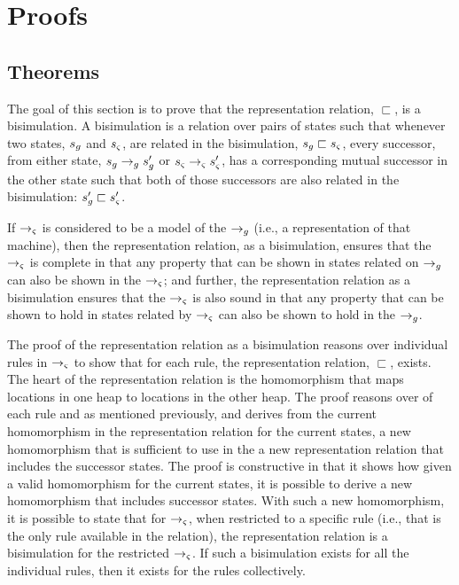 \section{Proofs}




\subsection{Theorems}

The goal of this section is to prove that the representation relation,
$\sqsubset$, is a bisimulation.  A bisimulation is a relation over pairs of states such that whenever two states, $s_{g}$ and
$s_{\varsigma}$, are related in the bisimulation, $s_{g} \sqsubset
s_{\varsigma}$, every successor, from either state, $s_{g}
\rightarrow_{g} s_{g}^\prime$ or $s_{\varsigma} \rightarrow_{\varsigma}
s_{\varsigma}^\prime$, has a corresponding mutual successor in the other
state such that both of those successors are also related in the
bisimulation: $s_{g}^\prime \sqsubset s_{\varsigma}^\prime$.

If $\rightarrow_{\varsigma}$ is considered to be a model of the
$\rightarrow_{g}$ (i.e., a representation of that machine), then the
representation relation, as a bisimulation, ensures that the
$\rightarrow_{\varsigma}$ is complete in that any property that can be
shown in states related on $\rightarrow_{g}$ can also be shown in the
$\rightarrow_{\varsigma}$; and further, the representation relation as a
bisimulation ensures that the $\rightarrow_{\varsigma}$ is also sound in
that any property that can be shown to hold in states related by $\rightarrow_{\varsigma}$
can also be shown to hold in the $\rightarrow_{g}$.

The proof of the representation relation as a bisimulation reasons
over individual rules in $\rightarrow_{\varsigma}$ to show that for
each rule, the representation relation, $\sqsubset$, exists. The heart
of the representation relation is the homomorphism that maps locations
in one heap to locations in the other heap. The proof reasons over of
each rule and as mentioned previously, and derives from the current
homomorphism in the representation relation for the current states, a
new homomorphism that is sufficient to use in the a new representation
relation that includes the successor states. The proof is constructive
in that it shows how given a valid homomorphism for the current
states, it is possible to derive a new homomorphism that includes
successor states. With such a new homomorphism, it is possible to
state that for $\rightarrow_{\varsigma}$, when restricted to a specific
rule (i.e., that is the only rule available in the relation), the
representation relation is a bisimulation for the restricted
$\rightarrow_{\varsigma}$. If such a bisimulation exists for all the
individual rules, then it exists for the rules collectively.

